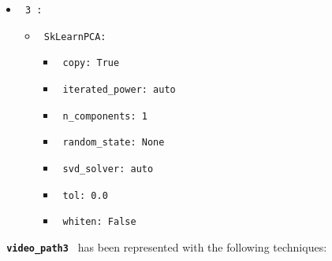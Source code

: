 \documentclass[11pt]{article}
\begin{document}
\begin{itemize}
\begin{itemize}
           \end{itemize}
    \item
     \verb| 3 :|
     \begin{itemize}
             \item
            \verb| SkLearnPCA: |

                   \begin{itemize}
                                    \item
                        \verb| copy: True |
                                    \item
                        \verb| iterated_power: auto |
                                    \item
                        \verb| n_components: 1 |
                                    \item
                        \verb| random_state: None |
                                    \item
                        \verb| svd_solver: auto |
                                    \item
                        \verb| tol: 0.0 |
                                    \item
                        \verb| whiten: False |
                            \end{itemize}
       
           \end{itemize}
\end{itemize}
\hfill\break
\hfill\break



\textbf{\lstinline[style=verbatim-text]| video_path3 |} has been represented with the following techniques:
\hfill\break
\hfill\break
\end{document}
